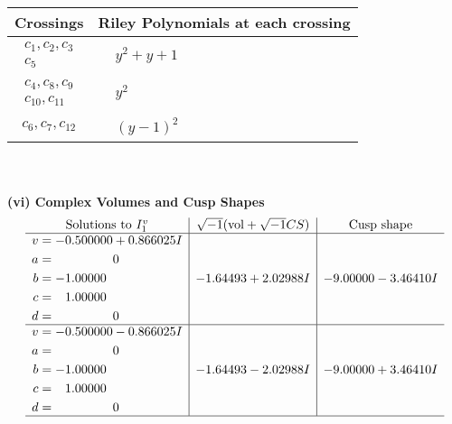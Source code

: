 \documentclass[1p]{elsarticle_modified}
\theoremstyle{definition}
\newcommand{\I}{\sqrt{-1}}
\begin{document}
\begin{tabular}{m{50pt}|m{274pt}}
Crossings & \hspace{64pt}Riley Polynomials at each crossing \\
\hline $$\begin{aligned}c_{1},c_{2},c_{3}\\c_{5}\end{aligned}$$&$\begin{aligned}
&y^2+y+1
\end{aligned}$\\
\hline $$\begin{aligned}c_{4},c_{8},c_{9}\\c_{10},c_{11}\end{aligned}$$&$\begin{aligned}
&y^2
\end{aligned}$\\
\hline $$\begin{aligned}c_{6},c_{7},c_{12}\end{aligned}$$&$\begin{aligned}
&(y-1)^2
\end{aligned}$\\
\hline
\end{tabular}\\~\\
\newpage\flushleft \textbf{(vi) Complex Volumes and Cusp Shapes}
$$\begin{array}{c|c|c}  
\text{Solutions to }I^v_{1}& \I (\text{vol} + \sqrt{-1}CS) & \text{Cusp shape}\\
 \hline 
\begin{aligned}
v &= -0.500000 + 0.866025 I \\
a &= \phantom{-0.000000 } 0 \\
b &= -1.00000\phantom{ +0.000000I} \\
c &= \phantom{-}1.00000\phantom{ +0.000000I} \\
d &= \phantom{-0.000000 } 0\end{aligned}
 & -1.64493 + 2.02988 I & -9.00000 - 3.46410 I \\ \hline\begin{aligned}
v &= -0.500000 - 0.866025 I \\
a &= \phantom{-0.000000 } 0 \\
b &= -1.00000\phantom{ +0.000000I} \\
c &= \phantom{-}1.00000\phantom{ +0.000000I} \\
d &= \phantom{-0.000000 } 0\end{aligned}
 & -1.64493 - 2.02988 I & -9.00000 + 3.46410 I\\
 \hline 
 \end{array}$$\newpage\newpage\renewcommand{\arraystretch}{1}
\end{document}
